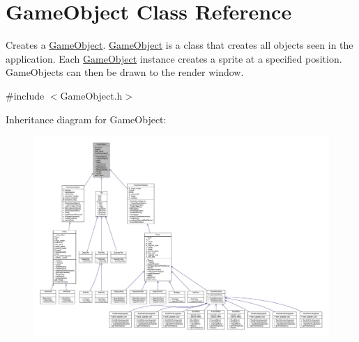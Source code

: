 \hypertarget{class_game_object}{\section{Game\+Object Class Reference}
\label{class_game_object}
}


Creates a \hyperlink{class_game_object}{Game\+Object}. \hyperlink{class_game_object}{Game\+Object} is a class that creates all objects seen in the application. Each \hyperlink{class_game_object}{Game\+Object} instance creates a sprite at a specified position. Game\+Objects can then be drawn to the render window.  




{\ttfamily \#include $<$Game\+Object.\+h$>$}



Inheritance diagram for Game\+Object\+:
\nopagebreak
\begin{figure}[H]
\begin{center}
\leavevmode
\includegraphics[width=350pt]{class_game_object__inherit__graph}
\end{center}
\end{figure}


